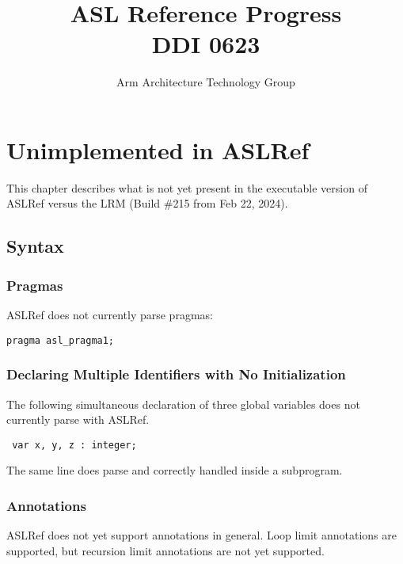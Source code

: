 \documentclass{book}
\author{Arm Architecture Technology Group}
\title{ASL Reference Progress \\
       DDI 0623}
\begin{document}
\maketitle

\tableofcontents{}





\chapter{Unimplemented in ASLRef}

This chapter describes what is not yet present in the executable version of ASLRef
versus the LRM (Build \#215 from Feb 22, 2024).

\section{Syntax}

\subsection{Pragmas}
ASLRef does not currently parse pragmas:
\begin{verbatim}
pragma asl_pragma1;
\end{verbatim}


\subsection{Declaring Multiple Identifiers with No Initialization}
The following simultaneous declaration of three global variables does not currently parse with ASLRef.
\begin{verbatim}
 var x, y, z : integer;
\end{verbatim}

The same line does parse and correctly handled inside a subprogram.


\subsection{Annotations}
ASLRef does not yet support annotations in general.
Loop limit annotations are supported, but recursion limit annotations are not yet supported.
\end{document}
